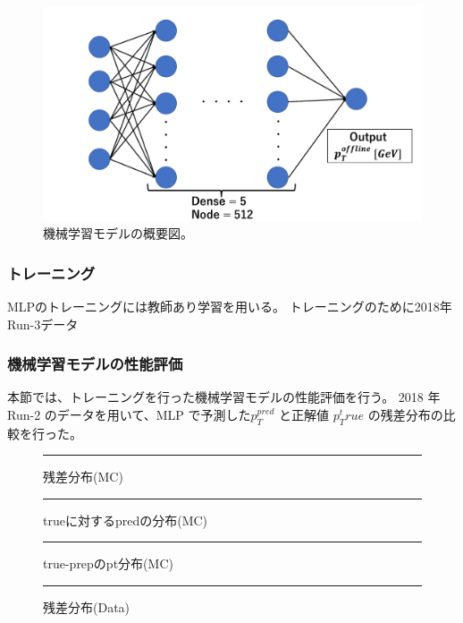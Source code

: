\begin{figure}[tb]
  \centering
  \includegraphics[clip, width=12cm]{fig/4/MLP.pdf}
  \caption{機械学習モデルの概要図。}
  \label{fig:MLP_overview}
\end{figure}


\subsubsection{トレーニング}
MLPのトレーニングには教師あり学習を用いる。
トレーニングのために2018年Run-3データ



\subsubsection{機械学習モデルの性能評価}
本節では、トレーニングを行った機械学習モデルの性能評価を行う。
2018 年 Run-2 のデータを用いて、MLP で予測した$p_{T}^{pred}$ と正解値 $p_{T}^true$ の残差分布の比較を行った。

\begin{figure}[tb]
  \centering
  \rule{8cm}{6cm}
  \caption{残差分布(MC)}
  \label{fig:fit_def}
\end{figure}

\begin{figure}[tb]
  \centering
  \rule{8cm}{6cm}
  \caption{trueに対するpredの分布(MC)}
  \label{fig:fit_def}
\end{figure}

\begin{figure}[tb]
  \centering
  \rule{8cm}{6cm}
  \caption{true-prepのpt分布(MC)}
  \label{fig:fit_def}
\end{figure}

\begin{figure}[tb]
  \centering
  \rule{8cm}{6cm}
  \caption{残差分布(Data)}
  \label{fig:fit_def}
\end{figure}


